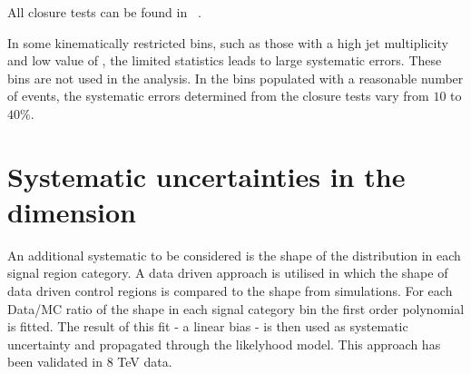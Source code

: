 All closure tests can be found in ~\cite{alphaTnote}.


In some kinematically restricted bins, such as those with a high jet multiplicity and low value of \scalht, the
limited statistics leads to large systematic errors. These bins are not used in the analysis. 
In the bins populated with a reasonable number of events, the systematic errors determined from the closure tests vary from $10$ to
$40\%$.


\section{Systematic uncertainties in the \mht dimension}

An additional systematic to be considered is the shape of the \mht distribution in each signal region category. 
A data driven approach is utilised in which the shape of data driven control regions is compared to the \mht shape from simulations.
For each Data/MC ratio of the shape in each signal category bin the first order polynomial is fitted. The result of this fit - a linear bias - 
is then used as systematic uncertainty and propagated through the likelyhood model.
This approach has been validated in 8 TeV data. 




